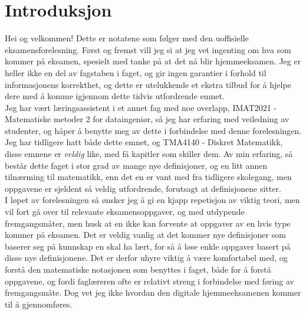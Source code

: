 \section{Introduksjon}

Hei og velkommen! Dette er notatene som følger med den uoffisielle eksamensforelesning.
Først og fremst vill jeg si at jeg vet ingenting om hva som kommer på eksamen,
spesielt med tanke på at det nå blir hjemmeeksamen. Jeg er heller ikke en del av fagstaben
i faget, og gir ingen garantier i forhold til informasjonens korrekthet, og dette er utelukkende
et ekstra tilbud for å hjelpe dere med å komme igjennom dette tidvis utfordrende emnet.\\

\noindent Jeg har vært læringsassistent i et annet fag med noe overlapp, IMAT2021 - Matematiske metoder 2 for dataingeniør,
så jeg har erfaring med veiledning av studenter, og håper å benytte meg av dette i forbindelse med denne forelesningen.
Jeg har tidligere hatt både dette emnet, og TMA4140 - Diskret Matematikk, disse emnene er \textit{veldig} like, med 
få kapitler som skiller dem. Av min erfaring, så består dette faget i stor grad av mange nye definisjoner,
og en litt annen tilnærming til matematikk, enn det en er vant med fra tidligere skolegang, men oppgavene er sjeldent 
så veldig utfordrende, forutsagt at definisjonene sitter.\\

\noindent I løpet av forelesningen så ønsker jeg å gi en kjapp repetisjon av viktig teori,
men vil fort gå over til relevante eksamensoppgaver, og med utdypende fremgangsmåter, men husk at en ikke kan forvente
at oppgaver av en hvis type kommer på eksamen. Det er veldig vanlig at det kommer nye definisjoner som baserer seg på
kunnskap en skal ha lært, for så å løse enkle oppgaver basert på disse nye definisjonene. Det er derfor uhyre viktig
å være komfortabel med, og forstå den matematiske notasjonen som benyttes i faget, både for å forstå oppgavene, og
fordi faglæreren ofte er relativt streng i forbindelse med føring av fremgangsmåte. Dog vet jeg ikke hvordan den
digitale hjemmeeksamenen kommer til å gjennomføres. 
